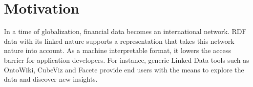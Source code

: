 \documentclass[sw]{iosart2x}
\begin{document}


\section{Motivation}\label{sec:motivation}
In a time of globalization,
financial data becomes an international network.
RDF data with its linked nature supports a representation that takes this network nature into account.
As a machine interpretable format, it lowers the access barrier for application developers.
For instance, generic Linked Data tools such as OntoWiki, CubeViz and Facete provide end users with the means to explore the data and discover new insights.







\end{document}
